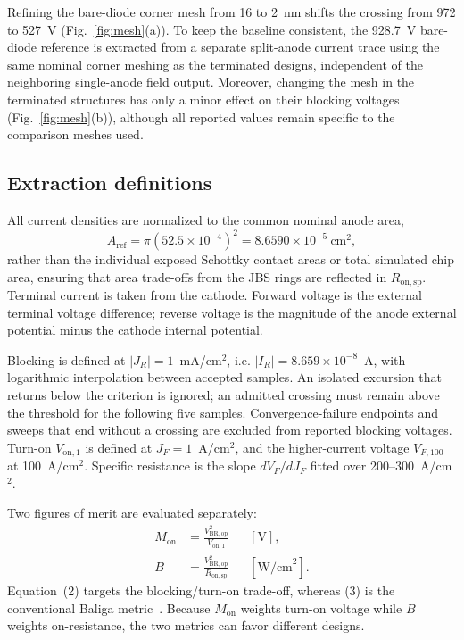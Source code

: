 \documentclass[journal,10pt]{IEEEtran}
\newcommand{\Von}{\ensuremath{V_{\mathrm{on},1}}}
\newcommand{\Ron}{\ensuremath{R_{\mathrm{on,sp}}}}
\begin{document}
Refining the bare-diode corner mesh from 16 to 2~nm shifts the crossing from 972 to 527~V (Fig.~\ref{fig:mesh}(a)). To keep the baseline consistent, the 928.7~V bare-diode reference is extracted from a separate split-anode current trace using the same nominal corner meshing as the terminated designs, independent of the neighboring single-anode field output. Moreover, changing the mesh in the terminated structures has only a minor effect on their blocking voltages (Fig.~\ref{fig:mesh}(b)), although all reported values remain specific to the comparison meshes used.

\subsection{Extraction definitions}
All current densities are normalized to the common nominal anode area,
\begin{equation}
A_{\mathrm{ref}}=\pi(52.5\times10^{-4})^2=8.6590\times10^{-5}\ \mathrm{cm}^2 ,
\end{equation}
rather than the individual exposed Schottky contact areas or total simulated chip area, ensuring that area trade-offs from the JBS rings are reflected in $\Ron$. Terminal current is taken from the cathode. Forward voltage is the external terminal voltage difference; reverse voltage is the magnitude of the anode external potential minus the cathode internal potential.

Blocking is defined at $|J_R|=1$~mA/cm$^2$, i.e. $|I_R|=8.659\times10^{-8}$~A, with logarithmic interpolation between accepted samples. An isolated excursion that returns below the criterion is ignored; an admitted crossing must remain above the threshold for the following five samples. Convergence-failure endpoints and sweeps that end without a crossing are excluded from reported blocking voltages. Turn-on $\Von$ is defined at $J_F=1$~A/cm$^2$, and the higher-current voltage $V_{F,100}$ at 100~A/cm$^2$. Specific resistance is the slope $dV_F/dJ_F$ fitted over 200--300~A/cm$^2$.

Two figures of merit are evaluated separately:
\begin{align}
M_{\mathrm{on}}&=\frac{V_{\mathrm{BR,op}}^2}{V_{\mathrm{on},1}} &&[\mathrm{V}],\\
B&=\frac{V_{\mathrm{BR,op}}^2}{R_{\mathrm{on,sp}}} &&[\mathrm{W/cm}^2].
\end{align}
Equation~(2) targets the blocking/turn-on trade-off, whereas (3) is the conventional Baliga metric~\cite{Baliga1982_JAP}. Because $M_{\mathrm{on}}$ weights turn-on voltage while $B$ weights on-resistance, the two metrics can favor different designs.
\end{document}
